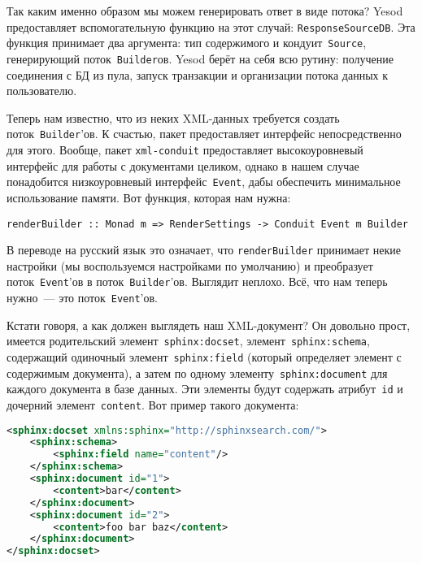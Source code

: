Так каким именно образом мы можем генерировать ответ в виде потока? Yesod предоставляет вспомогательную функцию на этот случай: \lstinline'ResponseSourceDB'. Эта функция принимает два аргумента: тип содержимого и кондуит~\lstinline'Source', генерирующий поток~\lstinline'Builder'ов. Yesod берёт на себя всю рутину: получение соединения с БД из пула, запуск транзакции и организации потока данных к пользователю.

Теперь нам известно, что из неких XML-данных требуется создать поток~\lstinline!Builder!'ов. К счастью, пакет  предоставляет интерфейс непосредственно для этого. Вообще, пакет \texttt{xml-conduit} предоставляет высокоуровневый интерфейс для работы с документами целиком, однако в нашем случае понадобится низкоуровневый интерфейс~\lstinline'Event', дабы обеспечить минимальное использование памяти. Вот функция, которая нам нужна:
\begin{lstlisting}
renderBuilder :: Monad m => RenderSettings -> Conduit Event m Builder
\end{lstlisting}

В переводе на русский язык это означает, что \lstinline'renderBuilder' принимает некие настройки (мы воспользуемся настройками по умолчанию) и преобразует поток~\lstinline!Event!'ов в поток~\lstinline!Builder!'ов. Выглядит неплохо. Всё, что нам теперь нужно~--- это поток~\lstinline!Event!'ов.

Кстати говоря, а как должен выглядеть наш XML-документ? Он довольно прост, имеется родительский элемент~\lstinline'sphinx:docset', элемент~\lstinline'sphinx:schema', содержащий одиночный элемент~\lstinline'sphinx:field' (который определяет элемент с содержимым документа), а затем по одному элементу~\lstinline'sphinx:document' для каждого документа в базе данных. Эти элементы будут содержать атрибут~\lstinline'id' и дочерний элемент~\lstinline'content'. Вот пример такого документа:
\begin{lstlisting}[language=XML,caption=Пример xmlpipe-документа]
<sphinx:docset xmlns:sphinx="http://sphinxsearch.com/">
    <sphinx:schema>
        <sphinx:field name="content"/>
    </sphinx:schema>
    <sphinx:document id="1">
        <content>bar</content>
    </sphinx:document>
    <sphinx:document id="2">
        <content>foo bar baz</content>
    </sphinx:document>
</sphinx:docset>
\end{lstlisting}

